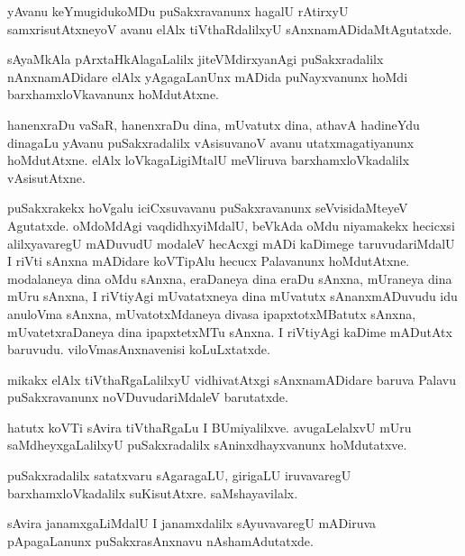 \begin{mng}
yAvanu keYmugidukoMDu puSakxravanunx hagalU rAtirxyU samxrisutAtxneyoV avanu elAlx tiVthaRdalilxyU sAnxnamADidaMtAgutatxde.
\end{mng}

\begin{mng}
sAyaMkAla pArxtaHkAlagaLalilx jiteVMdirxyanAgi puSakxradalilx nAnxnamADidare elAlx yAgagaLanUnx mADida puNayxvanunx hoMdi barxhamxloVkavanunx hoMdutAtxne.
\end{mng}

\begin{mng}
hanenxraDu vaSaR, hanenxraDu dina, mUvatutx dina, athavA hadineYdu dinagaLu yAvanu puSakxradalilx vAsisuvanoV avanu utatxmagatiyanunx hoMdutAtxne. elAlx loVkagaLigiMtalU meVliruva barxhamxloVkadalilx vAsisutAtxne.
\end{mng}

\begin{mng}
puSakxrakekx hoVgalu iciCxsuvavanu puSakxravanunx seVvisidaMteyeV Agutatxde. oMdoMdAgi vaqdidhxyiMdalU, beVkAda oMdu niyamakekx hecicxsi alilxyavaregU mADuvudU modaleV hecAcxgi mADi kaDimege taruvudariMdalU I riVti sAnxna mADidare koVTipAlu hecucx Palavanunx hoMdutAtxne. modalaneya dina oMdu sAnxna, eraDaneya dina eraDu sAnxna, mUraneya dina mUru sAnxna, I riVtiyAgi mUvatatxneya dina mUvatutx sAnanxmADuvudu idu anuloVma sAnxna, mUvatotxMdaneya divasa ipapxtotxMBatutx sAnxna, mUvatetxraDaneya dina ipapxtetxMTu sAnxna. I riVtiyAgi kaDime mADutAtx baruvudu. viloVmasAnxnavenisi koLuLxtatxde.
\end{mng}

\begin{mng}
mikakx elAlx tiVthaRgaLalilxyU vidhivatAtxgi sAnxnamADidare baruva Palavu puSakxravanunx noVDuvudariMdaleV barutatxde.
\end{mng}

\begin{mng}
hatutx koVTi sAvira tiVthaRgaLu I BUmiyalilxve. avugaLelalxvU mUru saMdheyxgaLalilxyU puSakxradalilx sAninxdhayxvanunx hoMdutatxve.
\end{mng}

\begin{mng}
puSakxradalilx satatxvaru sAgaragaLU, girigaLU iruvavaregU barxhamxloVkadalilx suKisutAtxre. saMshayavilalx.
\end{mng}

\begin{mng}
sAvira janamxgaLiMdalU I janamxdalilx sAyuvavaregU mADiruva pApagaLanunx puSakxrasAnxnavu nAshamAdutatxde.
\end{mng}

